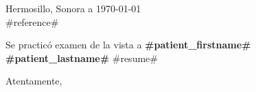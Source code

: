 \documentclass[12pt]{letter}
\begin{document}
\begin{letter}

	\begin{flushright}
		Hermosillo, Sonora a \today\\
		#reference#\\
	\end{flushright}
	\vspace{70pt}

	Se practicó examen de la vista a \textbf{#patient_firstname# #patient_lastname#} #resume#\\

	\vspace{70pt}
	\closing{Atentamente,}

\end{letter}
\end{document}
